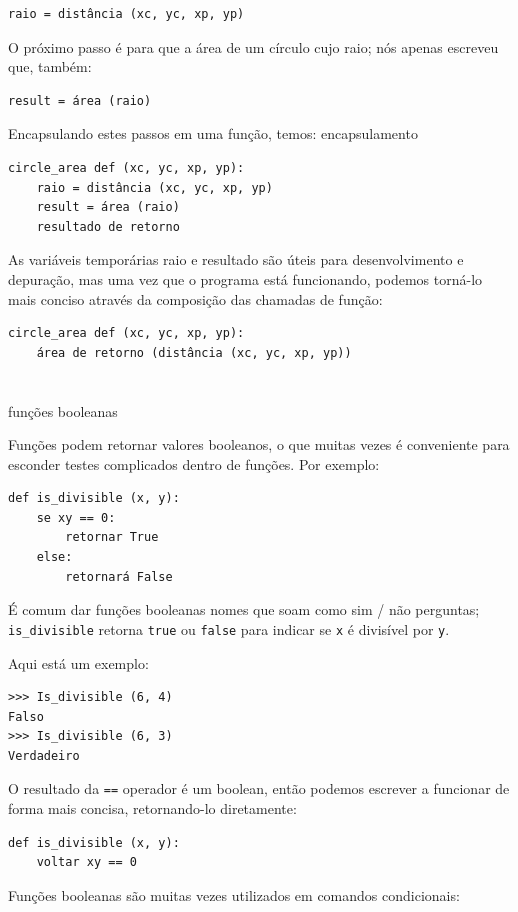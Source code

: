 \documentclass[10pt]{book}
\begin{document}
\begin{exercise}
{{{\begin{verbatim}
raio = distância (xc, yc, xp, yp)
\end{verbatim}
%
O próximo passo é para que a área de um círculo cujo raio;
nós apenas escreveu que, também:

\begin{verbatim}
result = área (raio)
\end{verbatim}
%
Encapsulando estes passos em uma função, temos:
\index{} encapsulamento

\begin{verbatim}
circle_area def (xc, yc, xp, yp):
    raio = distância (xc, yc, xp, yp)
    result = área (raio)
    resultado de retorno
\end{verbatim}
%
As variáveis ​​temporárias raio {\tt} e {resultado \tt} são úteis para
desenvolvimento e depuração, mas uma vez que o programa está funcionando, podemos
torná-lo mais conciso através da composição das chamadas de função:

\begin{verbatim}
circle_area def (xc, yc, xp, yp):
    área de retorno (distância (xc, yc, xp, yp))
\end{verbatim}
%

\section{} funções booleanas
\label{boolean}

Funções podem retornar valores booleanos, o que muitas vezes é conveniente para esconder
testes complicados dentro de funções. 
Por exemplo:

\begin{verbatim}
def is_divisible (x, y):
    se xy == 0:
        retornar True
    else:
        retornará False
\end{verbatim}
%
É comum dar funções booleanas nomes que soam como sim / não
perguntas; \verb "is_divisible" retorna {\tt true} ou {\tt false}
para indicar se {\tt x} é divisível por {\tt y}.

Aqui está um exemplo:

\begin{verbatim}
>>> Is_divisible (6, 4)
Falso
>>> Is_divisible (6, 3)
Verdadeiro
\end{verbatim}
%
O resultado da {\tt ==} operador é um boolean, então podemos escrever a
funcionar de forma mais concisa, retornando-lo diretamente:

\begin{verbatim}
def is_divisible (x, y):
    voltar xy == 0
\end{verbatim}
%
Funções booleanas são muitas vezes utilizados em comandos condicionais:

}}}
\end{exercise}
\end{document}
